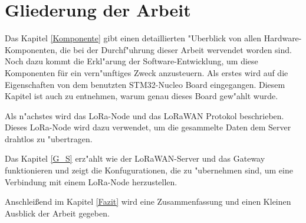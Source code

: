 \vspace{5cm}

\section{Gliederung der Arbeit}

Das Kapitel \ref{Komponente} gibt einen detaillierten "Uberblick von allen Hardware-Komponenten, die bei der Durchf"uhrung dieser Arbeit wervendet worden sind. Noch dazu kommt die Erkl"arung der Software-Entwicklung, um diese Komponenten für ein vern"unftiges Zweck anzusteuern. Als erstes wird auf die Eigenschaften von dem benutzten STM32-Nucleo Board eingegangen. Diesem Kapitel ist auch zu entnehmen, warum genau dieses Board gew"ahlt wurde. 

Als n"achstes wird das LoRa-Node und das LoRaWAN Protokol beschrieben. Dieses LoRa-Node wird dazu verwendet, um die gesammelte Daten dem Server drahtlos zu "ubertragen.

Das Kapitel \ref{G_S} erz"ahlt wie der LoRaWAN-Server und das Gateway funktionieren und zeigt die Konfugurationen, die zu "ubernehmen sind, um eine Verbindung mit einem LoRa-Node herzustellen.

Anschlei\ss{}end im Kapitel \ref{Fazit} wird eine Zusammenfassung und einen Kleinen Ausblick der Arbeit gegeben. 
   